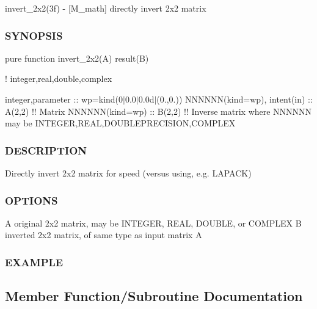 invert\+\_\+2x2(3f) -\/ \mbox{[}M\+\_\+math\mbox{]} directly invert 2x2 matrix 

\subsubsection*{S\+Y\+N\+O\+P\+S\+IS}

pure function invert\+\_\+2x2(\+A) result(\+B)

! integer,real,double,complex

integer,parameter \+:\+: wp=kind(0$\vert$0.0$\vert$0.0d$\vert$(0.,0.)) N\+N\+N\+N\+NN(kind=wp), intent(in) \+:\+: A(2,2) !! Matrix N\+N\+N\+N\+NN(kind=wp) \+:\+: B(2,2) !! Inverse matrix where N\+N\+N\+N\+NN may be I\+N\+T\+E\+G\+ER,R\+E\+AL,D\+O\+U\+B\+L\+E\+P\+R\+E\+C\+I\+S\+I\+ON,C\+O\+M\+P\+L\+EX

\subsubsection*{D\+E\+S\+C\+R\+I\+P\+T\+I\+ON}

\begin{DoxyVerb}Directly invert 2x2 matrix for speed (versus using, e.g. LAPACK)
\end{DoxyVerb}


\subsubsection*{O\+P\+T\+I\+O\+NS}

\begin{DoxyVerb}A  original 2x2 matrix, may be INTEGER, REAL, DOUBLE, or COMPLEX
B  inverted 2x2 matrix, of same type as input matrix A
\end{DoxyVerb}


\subsubsection*{E\+X\+A\+M\+P\+LE}

\subsection{Member Function/\+Subroutine Documentation}
\mbox{\label{interfacem__math_1_1invert__2x2_ab4c707576dd541a8fe6252364b4de2aa}} 
